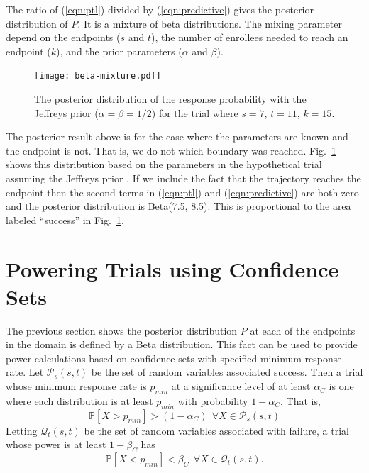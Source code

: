 \documentclass[12pt]{article}
\begin{document}
The ratio of (\ref{eqn:ptl}) divided by (\ref{eqn:predictive}) gives the 
posterior distribution of $P$. It is a mixture of beta distributions. The
mixing parameter depend on the endpoints ($s$ and $t$), the number of enrollees needed to reach an endpoint ($k$), and the prior parameters ($\alpha$ and
$\beta$).

\begin{figure}[t!]
\centering
\texttt{[image: beta-mixture.pdf]}
\caption{
The posterior distribution of the response probability with 
the Jeffreys prior ($\alpha=\beta=1/2$) for the trial where
$s=7$, $t=11$, $k=15$.
}
\label{fig:beta_mixture}
\end{figure}

The posterior result above is for the case where the parameters are known
and the endpoint is not. That is, we do not which boundary was reached.
Fig.~\ref{fig:beta_mixture} shows this distribution based on the 
parameters in the hypothetical trial assuming the
Jeffreys prior \citep{Jeffreys1946}.  If we include the fact that the
trajectory reaches the endpoint then the second terms in (\ref{eqn:ptl}) and
(\ref{eqn:predictive}) are both zero and the posterior distribution is
Beta(7.5, 8.5). This is proportional to the area labeled ``success'' in 
Fig.~\ref{fig:beta_mixture}.

\section{Powering Trials using Confidence Sets}

The previous section shows the posterior distribution $P$ at each of the 
endpoints in the domain is defined by a Beta distribution. This fact can be 
used to provide power calculations based on confidence sets with specified 
minimum response rate. Let $\mathcal{P}_s(s,t)$ be the set of random variables
associated success. Then a trial whose minimum
response rate is $p_{min}$ at a significance level of at least $\alpha_C$ is 
one where each distribution is at least $p_{min}$ with probability 
$1-\alpha_C$.  That is,
\begin{equation} \label{pwr_signif}
  \mathbb{P} \left[X > p_{min} \right] > (1 - \alpha_C) 
  \ \ \forall X \in \mathcal{P}_s(s,t)
\end{equation}
Letting $\mathcal{Q}_t(s,t)$ be the set of random variables associated with
failure, a trial whose power is at least $1-\beta_C$ has
\begin{equation*} \label{pwr}
  \mathbb{P} \left[X < p_{min} \right] < \beta_C
  \ \ \forall X \in \mathcal{Q}_t(s,t).
\end{equation*}
\end{document}

